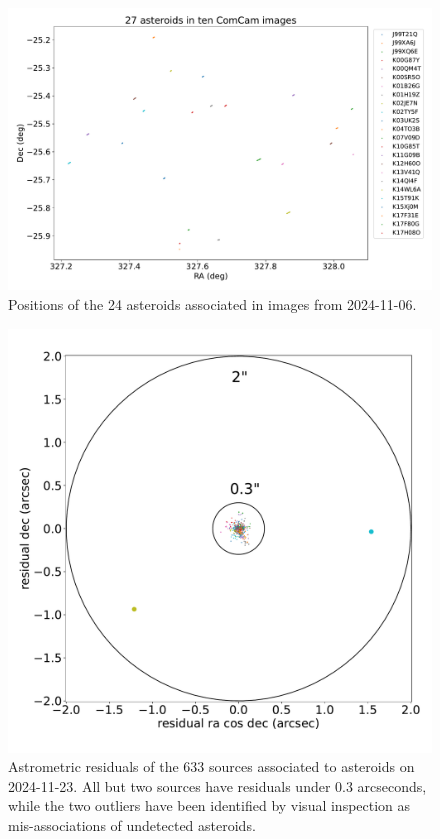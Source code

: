 \begin{figure}
  \label{fig:solar_system_positions}
  \includegraphics{sso_figures/24_asteroids.pdf}
  \caption{Positions of the 24 asteroids associated in images from 2024-11-06.}
\end{figure}

\begin{figure}
  \label{fig:solar_system_residuals}
  \includegraphics{sso_figures/sso_residuals.pdf}
  \caption{Astrometric residuals of the 633 sources associated to asteroids on 2024-11-23. All but two sources have residuals under 0.3 arcseconds, while the two outliers have been identified by visual inspection as mis-associations of undetected asteroids.}
\end{figure}

